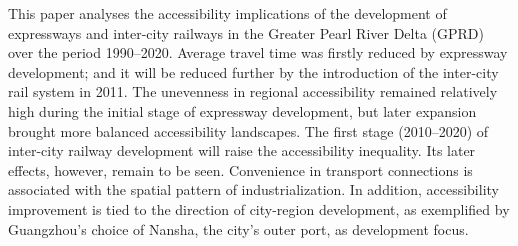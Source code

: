 This paper analyses the accessibility implications of the development of expressways and inter-city railways in the Greater Pearl River Delta (GPRD) over the period 1990–2020. Average travel time was firstly reduced by expressway development; and it will be reduced further by the introduction of the inter-city rail system in 2011. The unevenness in regional accessibility remained relatively high during the initial stage of expressway development, but later expansion brought more balanced accessibility landscapes. The first stage (2010–2020) of inter-city railway development will raise the accessibility inequality. Its later effects, however, remain to be seen. Convenience in transport connections is associated with the spatial pattern of industrialization. In addition, accessibility improvement is tied to the direction of city-region development, as exemplified by Guangzhou’s choice of Nansha, the city’s outer port, as development focus.